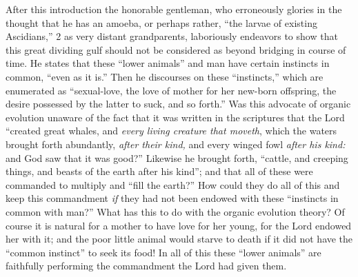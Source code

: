 After this introduction the honorable gentleman, who erroneously glories in the thought that
he has an amoeba, or perhaps rather, ``the larvae of existing Ascidians,'' 2 as very distant
grandparents, laboriously endeavors to show that this great dividing gulf should not be
considered as beyond bridging in course of time. He states that these ``lower animals'' and
man have certain instincts in common, ``even as it is.'' Then he discourses on these
``instincts,'' which are enumerated as ``sexual-love, the love of mother for her new-born
offspring, the desire possessed by the latter to suck, and so forth.'' Was this advocate of
organic evolution unaware of the fact that it was written in the scriptures that the Lord
``created great whales, and \textit{every living creature that moveth}, which the waters brought forth
abundantly, \textit{after their kind,} and every winged fowl \textit{after his kind:} and God saw that it was
good?'' Likewise he brought forth, ``cattle, and creeping things, and beasts of the earth after
his kind''; and that all of these were commanded to multiply and ``fill the earth?'' How could
they do all of this and keep this commandment \textit{if} they had not been endowed with these
``instincts in common with man?'' What has this to do with the organic evolution theory? Of
course it is natural for a mother to have love for her young, for the Lord endowed her with it;
and the poor little animal would starve to death if it did not have the ``common instinct'' to
seek its food! In all of this these ``lower animals'' are faithfully performing the commandment
the Lord had given them.

